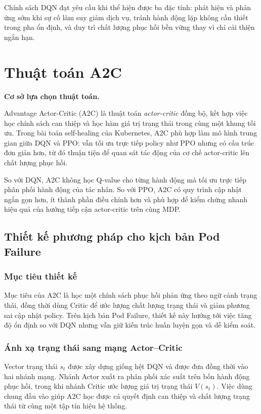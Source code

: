 \noindent Chính sách DQN đạt yêu cầu khi thể hiện được ba đặc tính: phát hiện và phản ứng sớm khi sự cố làm suy giảm dịch vụ, tránh hành động lặp không cần thiết trong pha ổn định, và duy trì chất lượng phục hồi bền vững thay vì chỉ cải thiện ngắn hạn.

\section{Thuật toán A2C}

\noindent \textbf{Cơ sở lựa chọn thuật toán.}

\noindent Advantage Actor-Critic (A2C) là thuật toán \textit{actor-critic} đồng bộ, kết hợp việc học chính sách can thiệp và học hàm giá trị trạng thái trong cùng một khung tối ưu. Trong bài toán self-healing của Kubernetes, A2C phù hợp làm mô hình trung gian giữa DQN và PPO: vẫn tối ưu trực tiếp policy như PPO nhưng có cấu trúc đơn giản hơn, từ đó thuận tiện để quan sát tác động của cơ chế actor-critic lên chất lượng phục hồi.

\noindent So với DQN, A2C không học Q-value cho từng hành động mà tối ưu trực tiếp phân phối hành động của tác nhân. So với PPO, A2C có quy trình cập nhật ngắn gọn hơn, ít thành phần điều chỉnh hơn và phù hợp để kiểm chứng nhanh hiệu quả của hướng tiếp cận actor-critic trên cùng MDP.

\subsection{Thiết kế phương pháp cho kịch bản Pod Failure}

\subsubsection{Mục tiêu thiết kế}

\noindent Mục tiêu của A2C là học một chính sách phục hồi phản ứng theo ngữ cảnh trạng thái, đồng thời dùng Critic để ước lượng chất lượng trạng thái và giảm phương sai cập nhật policy. Trên kịch bản Pod Failure, thiết kế này hướng tới việc tăng độ ổn định so với DQN nhưng vẫn giữ kiến trúc huấn luyện gọn và dễ kiểm soát.

\subsubsection{Ánh xạ trạng thái sang mạng Actor--Critic}

\noindent Vector trạng thái $s_t$ được xây dựng giống hệt DQN và được đưa đồng thời vào hai nhánh mạng. Nhánh Actor xuất ra phân phối xác suất trên bốn hành động phục hồi, trong khi nhánh Critic ước lượng giá trị trạng thái $V(s_t)$. Việc dùng chung đầu vào giúp A2C học được cả quyết định can thiệp và chất lượng trạng thái từ cùng một tập tín hiệu hệ thống.


